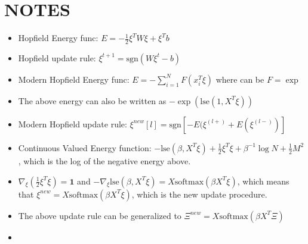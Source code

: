 \documentclass[letterpaper, 12pt]{article}
\begin{document}
\section*{NOTES}
\begin{itemize}
    \item Hopfield Energy func: $E = -\frac 1 2 \xi^TW\xi+\xi^Tb$
    \item Hopfield update rule: $\xi^{t+1}=\text{sgn}(W\xi^t-b)$
    \item Modern Hopfield Energy func: $E = -\sum_{i=1}^N F(x_i^T\xi)$ where can be $F = \exp$
    \item The above energy can also be written as $-\exp(\text{lse}(1,X^T\xi))$
    \item Modern Hopfield update rule: $\xi^{new}[l] = \text{sgn}[-E(\xi^{(l+)}+E(\xi^{(l-)})]$
    \item Continuous Valued Energy function: $-\text{lse}(\beta, X^T\xi) + \frac 1 2\xi^T\xi + \beta^{-1}\log{N} + \frac 1 2  M^2$, which is the log of the negative energy above.
    \item $\nabla_\xi(\frac 1 2 \xi^T\xi) = \bm{1}$ and $-\nabla_\xi\text{lse}(\beta,X^T\xi) = X\text{softmax}(\beta X^T\xi)$, which means that
    $\xi^{new} = X\text{softmax}(\beta X^T\xi)$, which is the new update procedure.
    \item The above update rule can be generalized to $\Xi^{new} = X\text{softmax}(\beta X^T\Xi)$
    \item 
\end{itemize}
\end{document}
